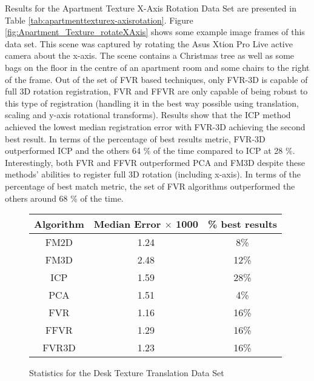 Results for the Apartment Texture X-Axis Rotation Data Set are presented in Table \ref{tab:apartmenttexturex-axisrotation}. Figure \ref{fig:Apartment_Texture_rotateXAxis} shows some example image frames of this data set. This scene was captured by rotating the Asus Xtion Pro Live active camera about the x-axis. The scene contains a Christmas tree as well as some bags on the floor in the centre of an apartment room and some chairs to the right of the frame. Out of the set of FVR based techniques, only FVR-3D is capable of full 3D rotation registration, FVR and FFVR are only capable of being robust to this type of registration (handling it in the best way possible using translation, scaling and y-axis rotational transforms). Results show that the ICP method achieved the lowest median registration error with FVR-3D achieving the second best result. In terms of the percentage of best results metric, FVR-3D outperformed ICP and the others 64 \% of the time compared to ICP at 28 \%. Interestingly, both FVR and FFVR outperformed PCA and FM3D despite these methods' abilities to register full 3D rotation (including x-axis). In terms of the percentage of best match metric, the set of FVR algorithms outperformed the others around 68 \% of the time. \\

\begin{figure}
\centering
\begin{tabular}{ccc}
\hline
\textbf{Algorithm} & \textbf{Median Error $\times$ 1000} & \textbf{\% best results}\\ \hline
FM2D	& 1.24 & 8\%\\
FM3D	& 2.48 & 12\%\\
ICP	& 1.59 & 28\%\\
PCA	& 1.51 & 4\%\\
FVR	& 1.16 & 16\%\\
FFVR	& 1.29 & 16\%\\
FVR3D	& 1.23 & 16\%\\
\end{tabular}
\caption{Statistics for the Desk Texture Translation Data Set}
\label{tab:desktexturetranslation}
\end{figure} 

